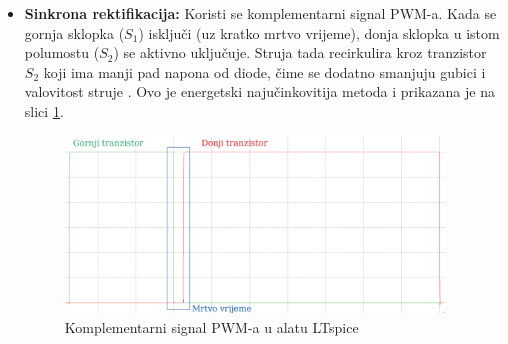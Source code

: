 \documentclass[diplomskirad]{fer}
\begin{document}
\begin{itemize}
\begin{itemize}
		      \item \textbf{Sinkrona rektifikacija:} Koristi se komplementarni signal
		            PWM-a. Kada se gornja sklopka ($S_1$) isključi (uz kratko mrtvo
		            vrijeme), donja sklopka u istom polumostu ($S_2$) se aktivno uključuje.
		            Struja tada recirkulira kroz tranzistor $S_2$ koji ima manji pad napona
		            od diode, čime se dodatno smanjuju gubici i valovitost struje \cite{TI2015}. Ovo je
		            energetski najučinkovitija metoda i prikazana je na slici
		            \ref{fig:soft_chopping}.
		            \begin{figure}[h!]
			            \centering
			            \includegraphics[width=0.95\textwidth]{Figures/soft_chopping.png}
			            \caption{Komplementarni signal PWM-a u alatu LTspice}
			            \label{fig:soft_chopping}
		            \end{figure}

	      \end{itemize}
\end{itemize}
\end{document}
